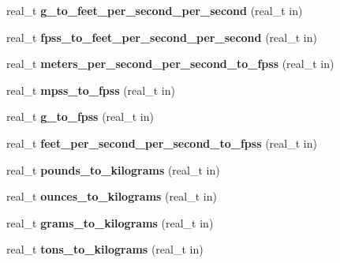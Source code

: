\begin{DoxyCompactItemize}
\item 
\hypertarget{namespaceetk_a91d3c5e95351c5d4b3038c86a2853ca3}{real\-\_\-t {\bfseries g\-\_\-to\-\_\-feet\-\_\-per\-\_\-second\-\_\-per\-\_\-second} (real\-\_\-t in)}\label{namespaceetk_a91d3c5e95351c5d4b3038c86a2853ca3}

\item 
\hypertarget{namespaceetk_ac7a7656bfc10a9c6f0ed93af3353df37}{real\-\_\-t {\bfseries fpss\-\_\-to\-\_\-feet\-\_\-per\-\_\-second\-\_\-per\-\_\-second} (real\-\_\-t in)}\label{namespaceetk_ac7a7656bfc10a9c6f0ed93af3353df37}

\item 
\hypertarget{namespaceetk_adc531a1d882fe48cc8e69a2f7222edbe}{real\-\_\-t {\bfseries meters\-\_\-per\-\_\-second\-\_\-per\-\_\-second\-\_\-to\-\_\-fpss} (real\-\_\-t in)}\label{namespaceetk_adc531a1d882fe48cc8e69a2f7222edbe}

\item 
\hypertarget{namespaceetk_ac0d65c73de3f62bbc58d0408c937541f}{real\-\_\-t {\bfseries mpss\-\_\-to\-\_\-fpss} (real\-\_\-t in)}\label{namespaceetk_ac0d65c73de3f62bbc58d0408c937541f}

\item 
\hypertarget{namespaceetk_aa36cf3b1c72052ba8456c2a2b851ba69}{real\-\_\-t {\bfseries g\-\_\-to\-\_\-fpss} (real\-\_\-t in)}\label{namespaceetk_aa36cf3b1c72052ba8456c2a2b851ba69}

\item 
\hypertarget{namespaceetk_a2c14ae15df8a92090d762463829a258d}{real\-\_\-t {\bfseries feet\-\_\-per\-\_\-second\-\_\-per\-\_\-second\-\_\-to\-\_\-fpss} (real\-\_\-t in)}\label{namespaceetk_a2c14ae15df8a92090d762463829a258d}

\item 
\hypertarget{namespaceetk_a5b1c278baf7e38abac4472d532172f13}{real\-\_\-t {\bfseries pounds\-\_\-to\-\_\-kilograms} (real\-\_\-t in)}\label{namespaceetk_a5b1c278baf7e38abac4472d532172f13}

\item 
\hypertarget{namespaceetk_a27705f82247a707fe336353694d9524b}{real\-\_\-t {\bfseries ounces\-\_\-to\-\_\-kilograms} (real\-\_\-t in)}\label{namespaceetk_a27705f82247a707fe336353694d9524b}

\item 
\hypertarget{namespaceetk_a0cb8deb6e85c5db58849113c4576e778}{real\-\_\-t {\bfseries grams\-\_\-to\-\_\-kilograms} (real\-\_\-t in)}\label{namespaceetk_a0cb8deb6e85c5db58849113c4576e778}

\item 
\hypertarget{namespaceetk_a42849cc5a9e06d2272d948035d30f39a}{real\-\_\-t {\bfseries tons\-\_\-to\-\_\-kilograms} (real\-\_\-t in)}\label{namespaceetk_a42849cc5a9e06d2272d948035d30f39a}


\end{DoxyCompactItemize}
